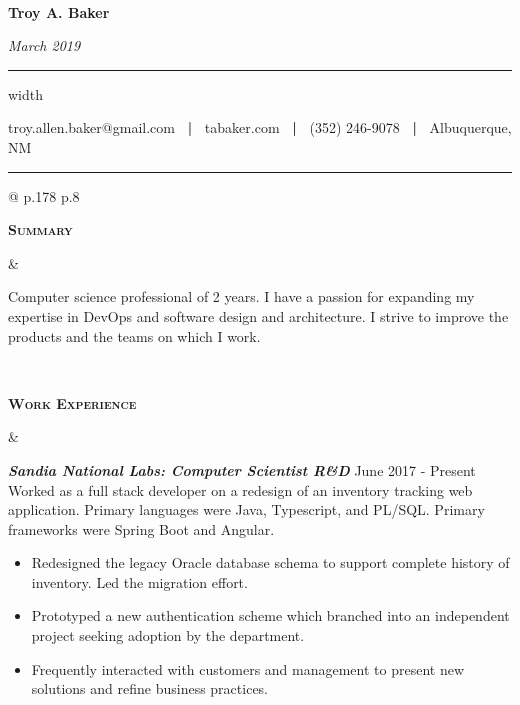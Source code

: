 \documentclass[10pt]{article}
\newcommand{\titlecell}[1]{%
  \begin{minipage}[t]{\linewidth}
    \raggedleft \textbf{#1}
\end{minipage}}
\newcommand{\contentcell}[1]{%
  \begin{minipage}[t]{\linewidth}
    #1
\end{minipage}}
\newcommand{\tablerowskip}{\vspace{4.83mm} \\}
\newcommand\titleline[4][t]{%
  \par\smallskip\noindent%
  \parbox[#1]{.333\textwidth}{\raggedright#2}%
  \parbox[#1]{.333\textwidth}{\centering#3}%
  \parbox[#1]{.333\textwidth}{\raggedleft#4}\par\smallskip%
}
\newcommand{\projectskip}{\vspace{3mm}}
\newcommand{\contentcellheader}[1]{\textbf{\textsl{#1}}}
\begin{document}
\thispagestyle{empty}

\titleline[t]{\ }{\Large \bf Troy A. Baker}{\textsl{March 2019}}
\smallskip
    {\hrule height 1pt width \textwidth}
    \smallskip
    \centerline{troy.allen.baker@gmail.com \textbf{\ |\ } tabaker.com \textbf{\ |\ } (352) 246-9078 \textbf{\ |\ } Albuquerque, NM}
    \smallskip
        {\hrule height 1pt}
        \smallskip\smallskip


        \noindent
        \begin{tabular}{@{} p{.178\textwidth} p{.8\textwidth}}
          \titlecell{\textsc{Summary}} &
          \contentcell{
            Computer science professional of 2 years. I have a passion for expanding my expertise in DevOps and software design and architecture. I strive to improve the products and the teams on which I work.
          }
          \tablerowskip

          \titlecell{\textsc{Work Experience}} &
          \contentcell{
            \contentcellheader{Sandia National Labs: Computer Scientist R\&D} \hfill June 2017 - Present \\
            Worked as a full stack developer on a redesign of an inventory tracking web application. Primary languages were Java, Typescript, and PL/SQL. Primary frameworks were Spring Boot and Angular.
            \begin{itemize}[itemsep=0pt,topsep=0pt,leftmargin=*] \itemsep -2pt
            \item Redesigned the legacy Oracle database schema to support complete history of inventory. Led the migration effort.
            \item Prototyped a new authentication scheme which branched into an independent project seeking adoption by the department.
            \item Frequently interacted with customers and management to present new solutions and refine business practices.
            \end{itemize}
          }
          \projectskip


\end{tabular}
\end{document}

